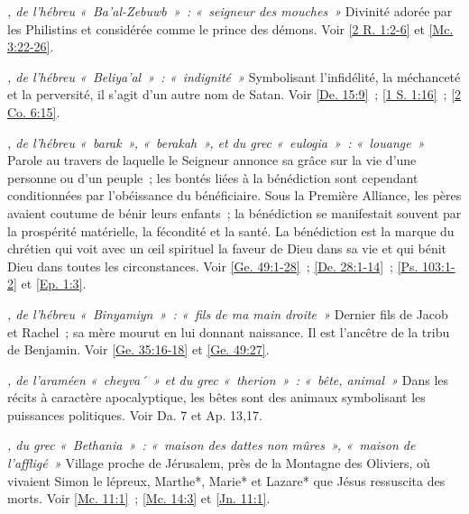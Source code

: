 \begin{multicols}{2}
\textit{, de l'hébreu «~Ba'al-Zebuwb~»~: «~seigneur des mouches~»}\newline
Divinité adorée par les Philistins et considérée comme le prince des démons.\newline
Voir \vref{2 R. 1:2-6} et \vref{Mc. 3:22-26}.

\textit{, de l'hébreu «~Beliya'al~»~: «~indignité~»}\newline
Symbolisant l'infidélité, la méchanceté et la perversité, il s'agit d'un autre nom de Satan.\newline
Voir \vref{De. 15:9}~; \vref{1 S. 1:16}~; \vref{2 Co. 6:15}.

\textit{, de l'hébreu «~barak~», «~berakah~», et du grec «~eulogia~»~: «~louange~»}\newline
Parole au travers de laquelle le Seigneur annonce sa grâce sur la vie d'une personne ou d'un peuple~; les bontés liées à la bénédiction sont cependant conditionnées par l'obéissance du bénéficiaire. Sous la Première Alliance, les pères avaient coutume de bénir leurs enfants~; la bénédiction se manifestait souvent par la prospérité matérielle, la fécondité et la santé. La bénédiction est la marque du chrétien qui voit avec un œil spirituel la faveur de Dieu dans sa vie et qui bénit Dieu dans toutes les circonstances.\newline
Voir \vref{Ge. 49:1-28}~; \vref{De. 28:1-14}~; \vref{Ps. 103:1-2} et \vref{Ep. 1:3}.

\textit{, de l'hébreu «~Binyamiyn~»~: «~fils de ma main droite~»}\newline
Dernier fils de Jacob et Rachel~; sa mère mourut en lui donnant naissance. Il est l'ancêtre de la tribu de Benjamin.\newline
Voir \vref{Ge. 35:16-18} et \vref{Ge. 49:27}.

\textit{, de l'araméen «~cheyva´~» et du grec «~therion~»~: «~bête, animal~»}\newline
Dans les récits à caractère apocalyptique, les bêtes sont des animaux symbolisant les puissances politiques.\newline
Voir Da. 7 et Ap. 13,17.

\textit{, du grec «~Bethania~»~: «~maison des dattes non mûres~», «~maison de l'affligé~»}\newline
Village proche de Jérusalem, près de la Montagne des Oliviers, où vivaient Simon le lépreux, Marthe*, Marie* et Lazare* que Jésus ressuscita des morts.\newline
Voir \vref{Mc. 11:1}~; \vref{Mc. 14:3} et \vref{Jn. 11:1}.


\end{multicols}
